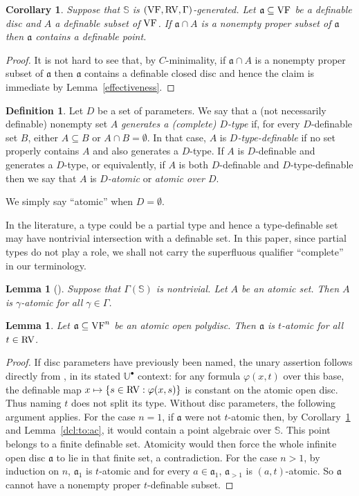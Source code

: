 \documentclass[12pt]{amsart}
\newcommand{\memph}[1]{{\color{magenta}\emph{#1}}}
\theoremstyle{plain}
\newtheorem{cor}[thm]{Corollary}
\newtheorem{lem}[thm]{Lemma}
\theoremstyle{definition}
\newtheorem{defn}[thm]{Definition}
\theoremstyle{remark}
\numberwithin{equation}{section}
\theoremstyle{plain}
\newcommand{\VF}{\textup{VF}}
\newcommand{\RV}{\textup{RV}}
\newcommand{\cmin}{$C$\nobreakdash}
\newcommand{\ga}{\mathfrak{a}}
\newcommand{\0}{\emptyset}
\newcommand{\bb}[1]{\mathbb{#1}}
\newcommand{\sub}{\subseteq}
\begin{document}
\begin{cor}\label{open:disc:def:point}
Suppose that $\mathbb{S}$ is $(\VF, \RV,\Gamma)$-generated.
Let $\ga \sub \VF$ be a definable disc and $A$ a definable subset of $\VF$. If $\ga \cap A$ is a nonempty proper subset of $\ga$ then $\ga$ contains a definable point.
\end{cor}
\begin{proof}
It is not hard to see that, by \cmin-minimality, if $\ga \cap A$ is a nonempty proper subset of $\ga$ then $\ga$ contains a definable closed disc and hence the claim is immediate by Lemma~\ref{effectiveness}.
\end{proof}

\begin{defn}
Let $D$ be a set of parameters. We say that a (not necessarily definable) nonempty set $A$ \memph{generates a (complete) $D$-type} if, for every $D$-definable set $B$, either $A \sub B$ or $A \cap B = \0$. In that case, $A$ is \memph{$D$-type-definable} if no set properly contains $A$ and also generates a $D$-type. If $A$ is $D$-definable and generates a $D$-type, or equivalently, if $A$ is both $D$-definable and $D$-type-definable then we say that $A$ is \memph{$D$-atomic} or \memph{atomic over $D$}.
\end{defn}

We simply say ``atomic'' when $D =\0$.

In the literature, a type could be a partial type and hence a type-definable set may have nontrivial intersection with a definable set. In this paper, since partial types do not play a role, we shall not carry the superfluous qualifier ``complete'' in our terminology.

\begin{lem}[{\cite[Lemma~3.3]{Yin:int:acvf}}]\label{atomic:base:change}
Suppose that $\Gamma(\mathbb S)$ is nontrivial. Let $A$ be an atomic set. Then $A$ is $\gamma$-atomic for all $\gamma \in \Gamma$.
\end{lem}


\begin{lem}\label{at:ball:t}
Let $\ga \sub \VF^n$ be an atomic open polydisc. Then $\ga$ is $t$-atomic for all $t \in \RV$.
\end{lem}
\begin{proof}
If disc parameters have previously been named, the unary assertion follows directly from \cite[Lemma~3.9]{Yin:int:acvf}, in its stated $\bb U^{\bullet}$ context: for any formula $\varphi(x,t)$ over this base, the definable map $x\mapsto\{s\in\RV:\varphi(x,s)\}$ is constant on the atomic open disc. Thus naming $t$ does not split its type. Without disc parameters, the following argument applies. For the case $n=1$, if $\ga$ were not $t$-atomic then, by Corollary~\ref{open:disc:def:point} and Lemma~\ref{dcl:to:ac}, it would contain a point algebraic over $\mathbb S$. This point belongs to a finite definable set. Atomicity would then force the whole infinite open disc $\ga$ to lie in that finite set, a contradiction. For the case $n>1$, by induction on $n$, $\ga_1$ is $t$-atomic and for every $a \in \ga_1$, $\ga_{>1}$ is $(a, t)$-atomic. So $\ga$ cannot have a nonempty proper $t$-definable subset.
\end{proof}
\end{document}
